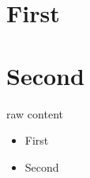 \section{First} \section{Second}
\begin{custom} \begin{inner}
raw content \end{inner} \end{custom}
\begin{itemize}
\item First \item Second
\end{itemize}
